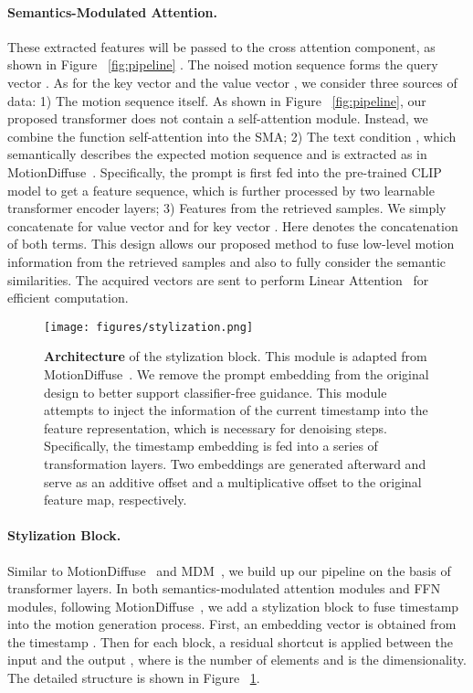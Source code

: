 \documentclass[10pt,twocolumn,letterpaper]{article}
\begin{document}
\paragraph{Semantics-Modulated Attention.} These extracted features will be passed to the cross attention component, as shown in Figure ~\ref{fig:pipeline} . The noised motion sequence forms the query vector . As for the key vector  and the value vector , we consider three sources of data: 1) The motion sequence  itself. As shown in Figure ~\ref{fig:pipeline}, our proposed transformer does not contain a self-attention module. Instead, we combine the function self-attention into the SMA; 2) The text condition , which semantically describes the expected motion sequence and is extracted as in MotionDiffuse~\cite{zhang2022motiondiffuse}. Specifically, the prompt is first fed into the pre-trained CLIP model to get a feature sequence, which is further processed by two learnable transformer encoder layers; 3) Features  from the retrieved samples. We simply concatenate  for value vector  and  for key vector . Here  denotes the concatenation of both terms. This design allows our proposed method to fuse low-level motion information from the retrieved samples and also to fully consider the semantic similarities. The acquired vectors  are sent to perform Linear Attention~\cite{shen2021efficient} for efficient computation.

\begin{figure}[]
    \centering
    \texttt{[image: figures/stylization.png]}
    \caption{\textbf{Architecture} of the stylization block. This module is adapted from MotionDiffuse~\cite{zhang2022motiondiffuse}. We remove the prompt embedding from the original design to better support classifier-free guidance. This module attempts to inject the information of the current timestamp into the feature representation, which is necessary for denoising steps. Specifically, the timestamp embedding  is fed into a series of transformation layers. Two embeddings are generated afterward and serve as an additive offset and a multiplicative offset to the original feature map, respectively. }
    \label{fig:style}
    \vspace{-10pt}
\end{figure}

\paragraph{Stylization Block.} Similar to MotionDiffuse~\cite{zhang2022motiondiffuse} and MDM~\cite{tevet2022human}, we build up our pipeline on the basis of transformer layers. In both semantics-modulated attention modules and FFN modules, following MotionDiffuse~\cite{zhang2022motiondiffuse}, we add a stylization block to fuse timestamp  into the motion generation process. First, an embedding vector  is obtained from the timestamp . Then for each block, a residual shortcut is applied between the input  and the output , where  is the number of elements and  is the dimensionality. The detailed structure is shown in Figure ~\ref{fig:style}.
\end{document}
